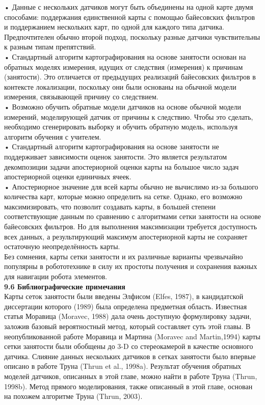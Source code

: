 \documentclass[10pt,a4paper]{article}
\begin{document}
•	Данные с нескольких датчиков могут быть объединены на одной карте двумя способами: поддержания единственной карты с помощью байесовских фильтров и поддержанием нескольких карт, по одной для каждого типа датчика. Предпочтителен обычно второй подход, поскольку разные датчики чувствительны к разным типам препятствий.\\

•	Стандартный алгоритм картографирования на основе занятости основан на обратных моделях измерения, идущих от следствия (измерения) к причинам (занятости). Это отличается от предыдущих реализаций байесовских фильтров в контексте локализации, поскольку они были основаны на обычной модели измерения, связывающей причину со следствием.\\

•	Возможно обучить обратные модели датчиков на основе обычной модели измерений, моделирующей датчик от причины к следствию. Чтобы это сделать, необходимо сгенерировать выборку и обучить обратную модель, используя алгоритм обучения с учителем.\\

•	Стандартный алгоритм картографирования на основе занятости не поддерживает зависимости оценок занятости. Это является результатом декомпозиции задачи апостериорной оценки карты на большое число задач апостериорной оценки единичных ячеек.\\

•	Апостериорное значение для всей карты обычно не вычислимо из-за большого количества карт, которые можно определить на сетке. Однако, его возможно максимизировать, что позволит создавать карты, в большей степени соответствующие данным по сравнению с алгоритмами сетки занятости на основе байесовских фильтров. Но для выполнения максимизации требуется доступность всех данных, а результирующий максимум апостериорной карты не сохраняет остаточную неопределённость карты.\\

Без сомнения, карты сетки занятости и их различные варианты чрезвычайно популярны в робототехнике в силу их простоты получения и сохранения важных для навигации робота элементов. \\

\textbf{9.6	Библиографические примечания}\\

Карты сеток занятости были введены Элфисом (Elfes, 1987), в кандидатской диссертации которого (1989) была определена предметная область. Известная статья Моравица (Moravec, 1988) дала очень доступную формулировку задачи, заложив базовый вероятностный метод, который составляет суть этой главы. В неопубликованной работе Моравица и Мартина (Moravec and Martin,1994) карты сетки занятости были обобщены до 3-D со стереокамерой в качестве основного датчика. Слияние данных нескольких датчиков в сетках занятости было впервые описано в работе Труна (Thrun et al., 1998a). Результат обучения обратных моделей датчиков, описанных в этой главе, можно найти в работе Труна (Thrun, 1998b). Метод прямого моделирования, также описанный в этой главе, основан на похожем алгоритме Труна (Thrun,  2003).
\end{document}

